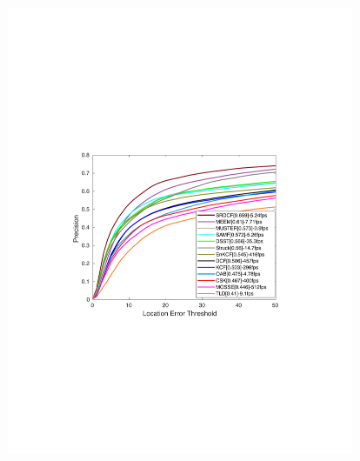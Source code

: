 \documentclass[10pt,twocolumn,letterpaper]{article}
\begin{document}
\begin{figure}
        \begin{subfigure}[b]{0.25\textwidth}
                \includegraphics[width=\linewidth]{./figures/Precision_UAV123.pdf}
        \end{subfigure}%
        \begin{subfigure}[b]{0.25\textwidth}

\end{subfigure}
\end{figure}
\end{document}
